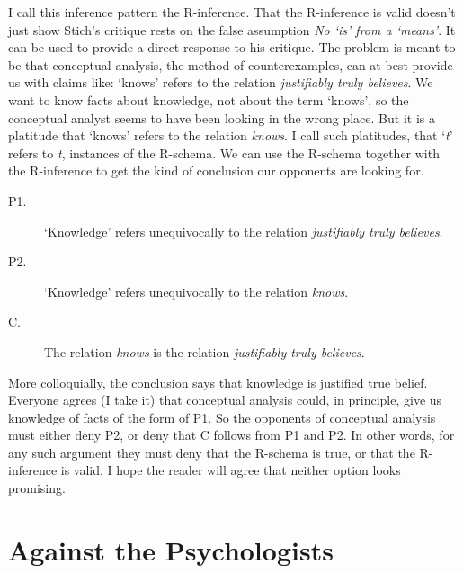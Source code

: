 \documentclass[
  11pt,
  letterpaper,
  DIV=11,
  numbers=noendperiod,
  oneside]{scrartcl}
\begin{document}
I call this inference pattern the R-inference. That the R-inference is
valid doesn't just show Stich's critique rests on the false assumption
\emph{No `is' from a `means'}. It can be used to provide a direct
response to his critique. The problem is meant to be that conceptual
analysis, the method of counterexamples, can at best provide us with
claims like: `knows' refers to the relation \emph{justifiably truly
believes}. We want to know facts about knowledge, not about the term
`knows', so the conceptual analyst seems to have been looking in the
wrong place. But it is a platitude that `knows' refers to the relation
\emph{knows}. I call such platitudes, that `\emph{t}' refers to
\emph{t}, instances of the R-schema. We can use the
R-schema together with the R-inference to get the kind of conclusion our
opponents are looking for.

\begin{description}
\item[P1.]
`Knowledge' refers unequivocally to the relation \emph{justifiably truly
believes}.
\item[P2.]
`Knowledge' refers unequivocally to the relation \emph{knows}.
\item[C.]
The relation \emph{knows} is the relation \emph{justifiably truly
believes}.
\end{description}

More colloquially, the conclusion says that knowledge is justified true
belief. Everyone agrees (I take it) that conceptual analysis could, in
principle, give us knowledge of facts of the form of P1. So the
opponents of conceptual analysis must either deny P2, or deny that C
follows from P1 and P2. In other words, for any such argument they must
deny that the R-schema is true, or that the R-inference is valid. I hope
the reader will agree that neither option looks promising.

\section{Against the Psychologists}\label{against-the-psychologists}
\end{document}
